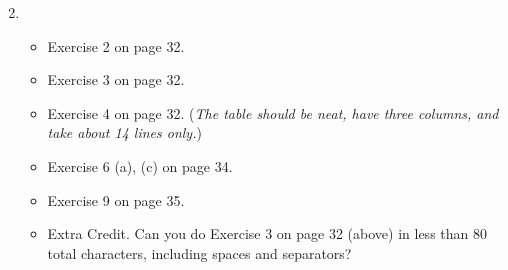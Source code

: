 \documentclass[12pt]{amsart}
\begin{document}
\medskip
\renewcommand{\labelenumi}{{\footnotesize\underline{\textsc{Chapter \arabic{enumi}}}}}
\begin{enumerate}
\setcounter{enumi}{1}
\item ~
    \begin{itemize}
    \item Exercise 2 on page 32.
    \item Exercise 3 on page 32.
    \item Exercise 4 on page 32. (\emph{The table should be neat, have three columns, and take about 14 lines only.})
    \item Exercise 6 (a), (c) on page 34.
    \item Exercise 9 on page 35.
    \item Extra Credit.  Can you do Exercise 3 on page 32 (above) in less than 80 total characters, including spaces and separators?
    \end{itemize}
\end{enumerate}
\end{document}

